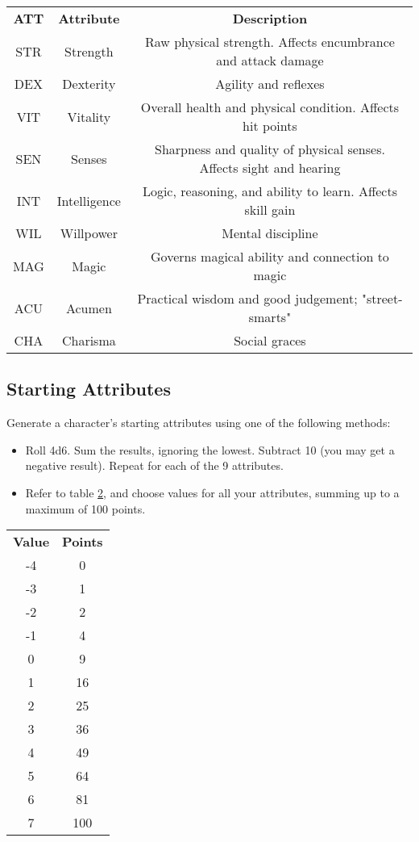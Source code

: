 
\begin{table}[h!]
    \begin{tabular}{c c c}
        \bfseries{ATT} & \bfseries{Attribute} & \bfseries{Description} \\
        STR & Strength & Raw physical strength. Affects encumbrance and attack damage \\
        DEX & Dexterity & Agility and reflexes \\
        VIT & Vitality & Overall health and physical condition. Affects hit points \\
        SEN & Senses & Sharpness and quality of physical senses. Affects sight and hearing \\
        INT & Intelligence & Logic, reasoning, and ability to learn. Affects skill gain \\
        WIL & Willpower & Mental discipline \\
        MAG & Magic & Governs magical ability and connection to magic \\
        ACU & Acumen & Practical wisdom and good judgement; "street-smarts" \\
        CHA & Charisma & Social graces \\
    \end{tabular}
    \label{tab:attributes}
\end{table}

\subsection{Starting Attributes}
Generate a character's starting attributes using one of the following methods:
\begin{itemize}
    \item Roll 4d6. Sum the results, ignoring the lowest. Subtract 10 (you may
        get a negative result). Repeat for each of the 9 attributes.
    \item Refer to table \ref{tab:point-buy}, and choose values for all your
        attributes, summing up to a maximum of 100 points.
\end{itemize}

\begin{table}[h!]
    \begin{tabular}{c c}
        \bfseries{Value} & \bfseries{Points} \\
        -4 & 0 \\
        -3 & 1 \\
        -2 & 2 \\
        -1 & 4 \\
        0 & 9 \\
        1 & 16 \\
        2 & 25 \\
        3 & 36 \\
        4 & 49 \\
        5 & 64 \\
        6 & 81 \\
        7 & 100 \\
    \end{tabular}
    \label{tab:point-buy}
\end{table}
